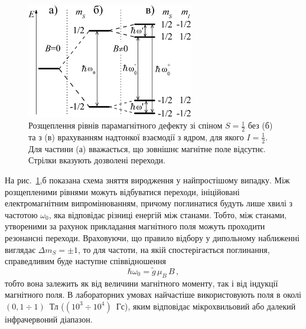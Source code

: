 \documentclass[10pt,a5paper,titlepage,oneside]{book}
\numberwithin{equation}{part}
\begin{document}
\begin{figure}[!b]
\center
\vspace{-5mm}
\includegraphics[width=0.65\textwidth]{Fig5_1}
\vspace{-3mm}
\caption{Розщеплення рівнів парамагнітного дефекту зі спіном $S=\frac{1}{2}$
без (б) та з (в) врахуванням надтонкої взаємодії з ядром, для якого  $I=\frac{1}{2}$.
Для частини (а) вважається, що зовнішнє магнітне поле відсутнє.
Стрілки вказують дозволені переходи.
}
\vspace{-3mm}
\label{F51}
\end{figure}

На рис.~\ref{F51},б показана схема зняття виродження у найпростішому випадку.
Між розщепленими рівнями можуть відбуватися переходи, ініційовані
електромагнітним випромінюванням, причому
поглинатися будуть лише хвилі з частотою $\omega_0$,
яка відповідає різниці енергій між станами.
Тобто, між станами, утвореними за рахунок прикладання магнітного поля можуть
проходити резонансні переходи.
Враховуючи, що правило відбору у дипольному наближенні виглядає $\Delta m_S=\pm1$,
то для частоти, на якій спостерігається поглинання, справедливим буде наступне співвідношення
\begin{equation}
\hbar\omega_0=\tilde{g}\, \mu_B\,B\,,
\end{equation}
тобто вона залежить як від величини магнітного моменту, так і від індукції магнітного поля.
В лабораторних умовах найчастіше використовують поля в околі $(0,1\div1)$~Тл ($(10^3\div10^4)$~Гс),
яким
відповідає
мікрохвильовий або далекий інфрачервоний діапазон.
\end{document}
